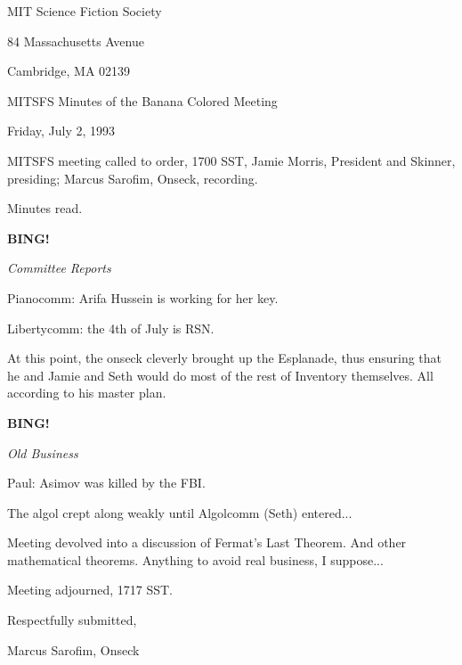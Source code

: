 \documentclass[12pt]{article}
\newcommand{\bing}{{\bf BING!} }
\newcommand{\goto}[1]{\bing \vskip 12pt \centerline{{\em{#1}}}}
\begin{document}
\begin{center}

MIT Science Fiction Society 

84 Massachusetts Avenue

Cambridge, MA 02139

\vspace{12pt}

MITSFS Minutes of the Banana Colored Meeting

Friday, July 2, 1993

\end{center}
 
\vspace{18pt}

\setlength{\parskip}{6pt}

\noindent
MITSFS meeting called to order, 1700 SST,
Jamie Morris, President and Skinner, presiding; Marcus Sarofim, Onseck, recording.

Minutes read.

\goto{Committee Reports}

Pianocomm: Arifa Hussein is working for her key.

Libertycomm: the 4th of July is RSN.

At this point, the onseck cleverly brought up the Esplanade, thus ensuring that he and Jamie and Seth would do most of the rest of Inventory themselves. All according to his master plan.

\goto{Old Business}

Paul: Asimov was killed by the FBI.

The algol crept along weakly until Algolcomm (Seth) entered...

Meeting devolved into a discussion of Fermat's Last Theorem. And other mathematical theorems. Anything to avoid real business, I suppose...

\vspace{12pt}

\noindent
Meeting adjourned, 1717 SST.

\vspace{18pt}

\centerline{Respectfully submitted,}
\centerline{Marcus Sarofim, Onseck}
\end{document}
